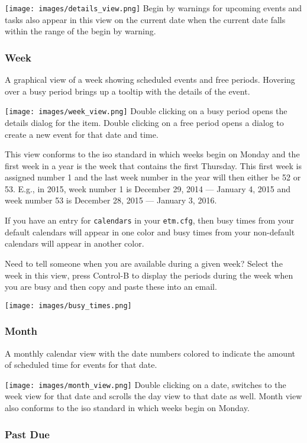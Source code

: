 \documentclass[]{article}
\makeatletter
\def\maxwidth{\ifdim\Gin@nat@width>\linewidth\linewidth
\else\Gin@nat@width\fi}
\let\Oldincludegraphics\includegraphics
\renewcommand{\includegraphics}[1]{\Oldincludegraphics[width=\maxwidth]{#1}}
\makeatother
\begin{document}
\texttt{[image: images/details\_view.png]}
Begin by warnings for upcoming events and tasks also appear in this view
on the current date when the current date falls within the range of the
begin by warning.

\subsubsection{Week}

A graphical view of a week showing scheduled events and free periods.
Hovering over a busy period brings up a tooltip with the details of the
event.

\texttt{[image: images/week\_view.png]}
Double clicking on a busy period opens the details dialog for the item.
Double clicking on a free period opens a dialog to create a new event
for that date and time.

This view conforms to the iso standard in which weeks begin on Monday
and the first week in a year is the week that contains the first
Thursday. This first week is assigned number 1 and the last week number
in the year will then either be 52 or 53. E.g., in 2015, week number 1
is December 29, 2014 --- January 4, 2015 and week number 53 is December
28, 2015 --- January 3, 2016.

If you have an entry for \texttt{calendars} in your \texttt{etm.cfg},
then busy times from your default calendars will appear in one color and
busy times from your non-default calendars will appear in another color.

Need to tell someone when you are available during a given week? Select
the week in this view, press Control-B to display the periods during the
week when you are busy and then copy and paste these into an email.

\texttt{[image: images/busy\_times.png]}
\subsubsection{Month}

A monthly calendar view with the date numbers colored to indicate the
amount of scheduled time for events for that date.

\texttt{[image: images/month\_view.png]}
Double clicking on a date, switches to the week view for that date and
scrolls the day view to that date as well. Month view also conforms to
the iso standard in which weeks begin on Monday.

\subsubsection{Past Due}
\end{document}
